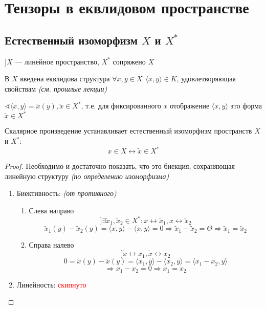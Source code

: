 

\cfoot{}

\renewcommand{\thesubsection}{\arabic{subsection}.}
\makeatletter
\renewcommand*{\@seccntformat}[1]{\csname the#1\endcsname\hspace{0.1cm}}
\makeatother



\section*{Тензоры в еквлидовом пространстве}

\subsection{Естественный изоморфизм $X$ и $X^*$}

$] X$ --- линейное пространство, $X^*$ сопряжено $X$

В $X$ введена еквлидова структура $\forall x,y\in X \ \ \langle x,y\rangle \in K$, удовлетворяющая свойствам \textit{(см. прошлые лекции)}

$\sphericalangle \langle x,y\rangle = \tilde x(y), \tilde x\in X^*$, т.е. для фиксированного $x$ отображение $\langle x,y\rangle$ это форма $\tilde x\in X^*$

\begin{lemma}
    Скалярное произведение устанавливает естественный изоморфизм пространств $X$ и $X^*$:
    $$x\in X \leftrightarrow \tilde x\in X^*$$
\end{lemma}
\begin{proof}
    Необходимо и достаточно показать, что это биекция, сохраняющая линейную структуру \textit{(по определению изоморфизма)}

    \begin{enumerate}
        \item Биективность: \textit{(от противного)}
              \begin{enumerate}
                  \item Слева направо $$] \exists \tilde x_1, \tilde x_2 \in X^* : x\leftrightarrow \tilde x_1, x\leftrightarrow \tilde x_2$$
                        $$\tilde x_1(y) - \tilde x_2(y) = \langle x, y\rangle - \langle x, y\rangle = 0 \Rightarrow \tilde x_1 - \tilde x_2 = \Theta \Rightarrow \tilde x_1 = \tilde x_2$$

                  \item Справа налево $$] \tilde x \leftrightarrow x_1, \tilde x \leftrightarrow x_2$$
                        $$0 = \tilde x(y) - \tilde x(y) = \langle x_1, y\rangle - \langle x_2, y\rangle = \langle x_1-x_2, y\rangle$$
                        $$\Rightarrow x_1-x_2=0\Rightarrow x_1=x_2$$
              \end{enumerate}
        \item Линейность: \textcolor{red}{скипнуто}
    \end{enumerate}
\end{proof}

